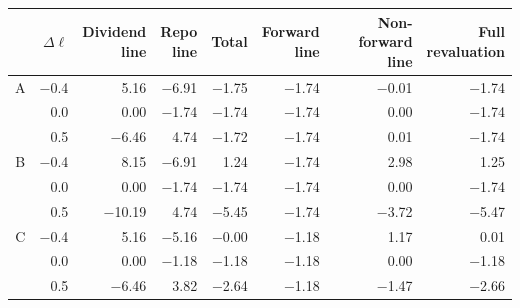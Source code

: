 {\small\begin{tabular}{crrrrrrr}
\toprule
 & $\Delta\ell$ & \makecell{Dividend\\line} & \makecell{Repo\\line} & Total & \makecell{Forward\\line} & \makecell{Non-forward\\line} & \makecell{Full\\revaluation} \\
\midrule
A & \num[retain-explicit-plus]{-0.4} & \num{5.16} & \num{-6.91} & \num{-1.75} & \num{-1.74} & \num{-0.01} & \num{-1.74} \\
 & \num{0.0} & \num{0.00} & \num{-1.74} & \num{-1.74} & \num{-1.74} & \num{0.00} & \num{-1.74} \\
 & \num[retain-explicit-plus]{+0.5} & \num{-6.46} & \num{4.74} & \num{-1.72} & \num{-1.74} & \num{0.01} & \num{-1.74} \\
\midrule
B & \num[retain-explicit-plus]{-0.4} & \num{8.15} & \num{-6.91} & \num{1.24} & \num{-1.74} & \num{2.98} & \num{1.25} \\
 & \num{0.0} & \num{0.00} & \num{-1.74} & \num{-1.74} & \num{-1.74} & \num{0.00} & \num{-1.74} \\
 & \num[retain-explicit-plus]{+0.5} & \num{-10.19} & \num{4.74} & \num{-5.45} & \num{-1.74} & \num{-3.72} & \num{-5.47} \\
\midrule
C & \num[retain-explicit-plus]{-0.4} & \num{5.16} & \num{-5.16} & \num{-0.00} & \num{-1.18} & \num{1.17} & \num{0.01} \\
 & \num{0.0} & \num{0.00} & \num{-1.18} & \num{-1.18} & \num{-1.18} & \num{0.00} & \num{-1.18} \\
 & \num[retain-explicit-plus]{+0.5} & \num{-6.46} & \num{3.82} & \num{-2.64} & \num{-1.18} & \num{-1.47} & \num{-2.66} \\
\bottomrule
\end{tabular}}
